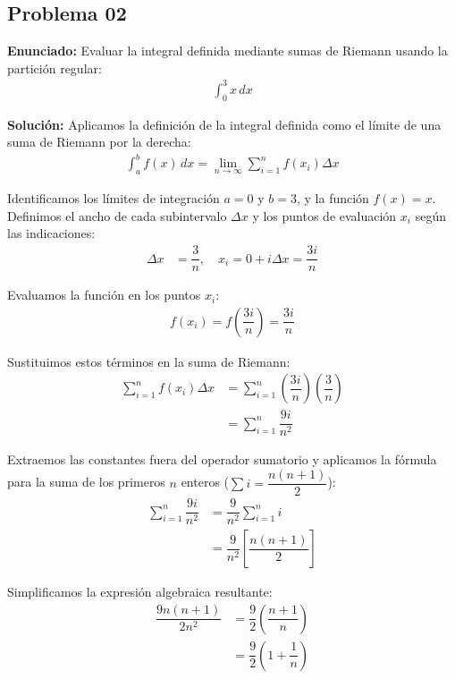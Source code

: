 \subsection*{Problema 02}

\noindent\textbf{Enunciado:} Evaluar la integral definida 
mediante sumas de Riemann usando la partición 
regular:
\begin{align*}
\int_{0}^{3} x \, dx
\end{align*}

\noindent\textbf{Solución:} 
Aplicamos la definición de la integral definida como 
el límite de una suma de Riemann por la derecha:
\begin{align*}
\int_{a}^{b} f(x) \, dx = \lim_{n \to \infty} \sum_{i=1}^{n} f(x_i) \Delta x
\end{align*}

Identificamos los límites de integración $a = 0$ y 
$b = 3$, y la función $f(x) = x$. Definimos el ancho 
de cada subintervalo $\Delta x$ y los puntos de 
evaluación $x_i$ según las indicaciones:
\begin{align*}
\Delta x &= \dfrac{3}{n}, \quad 
x_i = 0 + i \Delta x = \dfrac{3i}{n}
\end{align*}

Evaluamos la función en los puntos $x_i$:
\begin{align*}
f(x_i) = f\left(\dfrac{3i}{n}\right) = \dfrac{3i}{n}
\end{align*}

Sustituimos estos términos en la suma de Riemann:
\begin{align*}
\sum_{i=1}^{n} f(x_i) \Delta x &= \sum_{i=1}^{n} 
\left(\dfrac{3i}{n}\right) \left(\dfrac{3}{n}\right) \\
&= \sum_{i=1}^{n} \dfrac{9i}{n^2}
\end{align*}

Extraemos las constantes fuera del operador sumatorio 
y aplicamos la fórmula para la suma de los primeros 
$n$ enteros ($\sum i = \dfrac{n(n+1)}{2}$):
\begin{align*}
\sum_{i=1}^{n} \dfrac{9i}{n^2} &= \dfrac{9}{n^2} 
\sum_{i=1}^{n} i \\
&= \dfrac{9}{n^2} \left[ \dfrac{n(n+1)}{2} \right]
\end{align*}

Simplificamos la expresión algebraica resultante:
\begin{align*}
\dfrac{9n(n+1)}{2n^2} &= \dfrac{9}{2} \left( \dfrac{n+1}{n} 
\right) \\
&= \dfrac{9}{2} \left( 1 + \dfrac{1}{n} \right)
\end{align*}

